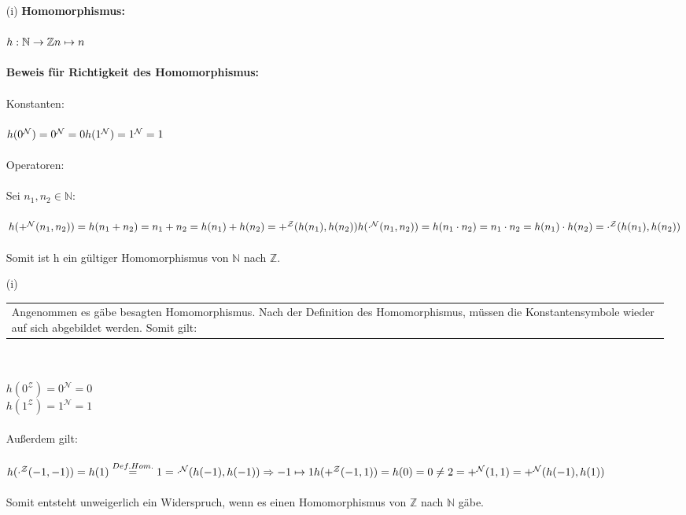 \documentclass[a4paper,10pt]{article}
\newcommand{\tabspace}{15cm}
\newcommand{\N}{\mathbb{N}}
\newcommand{\Z}{\mathbb{Z}}
\begin{document}
\begin{enumerate}
\item[(i)]
\textbf{Homomorphismus:} \\
\\
\( h: \N \rightarrow \Z \\
n \mapsto n \) \\
\\
\textbf{Beweis für Richtigkeit des Homomorphismus:} \\
\\
Konstanten:\\
\\
\( h(0^{\mathcal{N}}) = 0^{\mathcal{N}} = 0 \\
h(1^{\mathcal{N}}) = 1^{\mathcal{N}} = 1 \) \\
\\
Operatoren: \\
\\
Sei $n_1,n_2 \in \N$:\\
\\
\( h(+^{\mathcal{N}} (n_1,n_2)) = h(n_1 + n_2) = n_1 + n_2 
= h(n_1) + h(n_2) = +^{\mathcal{Z}} (h(n_1),h(n_2)) \\
\\
 h(\cdot^{\mathcal{N}} (n_1,n_2)) = h(n_1 \cdot n_2) = n_1 \cdot n_2 
= h(n_1) \cdot h(n_2) = \cdot^{\mathcal{Z}} (h(n_1),h(n_2)) \) \\
\\
Somit ist h ein gültiger Homomorphismus von $\N$ nach $\Z$.

\item[(i)]
\begin{tabular}{@{} p{\tabspace}}
Angenommen es gäbe besagten Homomorphismus. Nach der Definition des Homomorphismus, müssen die Konstantensymbole wieder auf sich abgebildet werden.
Somit gilt:
\end{tabular} \\
\\
$h(0^{\mathcal{Z}}) = 0^{\mathcal{N}} = 0 $ \\
$h(1^{\mathcal{Z}}) = 1^{\mathcal{N}} = 1 $ \\
\\
Außerdem gilt: \\
\\
\( h(\cdot^{\mathcal{Z}}(-1,-1)) = h(1) \overset{Def. Hom.}{=} 1 = \cdot^{\mathcal{N}}(h(-1),h(-1))\\
\Rightarrow -1 \mapsto 1\\
\\
h(+^{\mathcal{Z}}(-1,1)) = h(0) = 0 \neq 2 = +^{\mathcal{N}}(1,1) = +^{\mathcal{N}}(h(-1),h(1)) \) \\
\\
Somit entsteht unweigerlich ein Widerspruch, wenn es einen Homomorphismus von $\mathbb{Z}$ nach $\mathbb{N}$ gäbe.

\end{enumerate}
\end{document}
